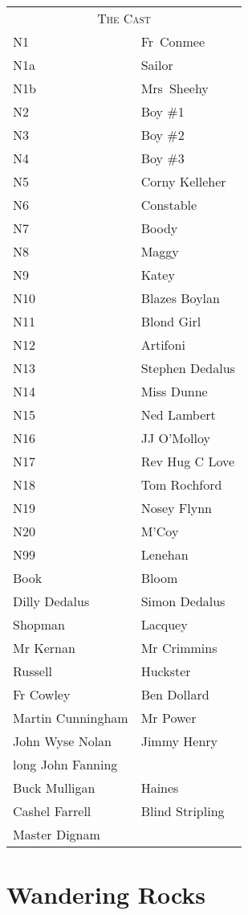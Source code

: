 \begin{tabular}{lp{10cm}}
    \multicolumn{2}{c}{\Large \textsc{The Cast}} \\
N1      & Fr~Conmee \\
N1a     & Sailor \\
N1b     & Mrs~Sheehy \\
N2      & Boy \#1 \\
N3      & Boy \#2 \\
N4      & Boy \#3 \\
N5      & Corny Kelleher \\
N6      & Constable \\
N7      & Boody \\
N8      & Maggy \\
N9      & Katey \\
N10     & Blazes Boylan \\
N11     & Blond Girl \\
N12     & Artifoni \\
N13     & Stephen Dedalus \\
N14     & Miss Dunne \\
N15     & Ned Lambert \\
N16     & JJ O'Molloy \\
N17     & Rev Hug C Love \\
N18     & Tom Rochford \\
N19     & Nosey Flynn \\
N20     & M'Coy \\
N99     & Lenehan \\
Book    & Bloom \\
Dilly Dedalus & Simon Dedalus \\
Shopman & Lacquey \\
Mr Kernan & Mr Crimmins \\
Russell & Huckster \\
Fr Cowley & Ben Dollard \\
Martin Cunningham & Mr Power \\
John Wyse Nolan & Jimmy Henry \\
long John Fanning \\
Buck Mulligan & Haines \\
Cashel Farrell & Blind Stripling \\
Master Dignam \\
\end{tabular}

\thispagestyle{empty}
\newpage


\setcounter{page}{1}

\section*{Wandering Rocks}




